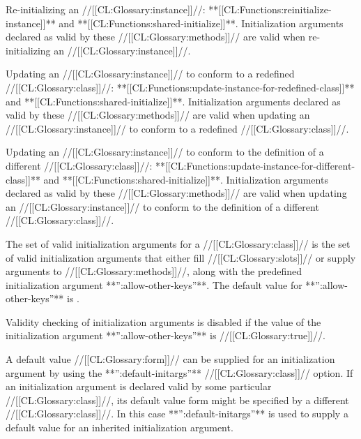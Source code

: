 \itemitem{--} Re-initializing an //[[CL:Glossary:instance]]//:
**[[CL:Functions:reinitialize-instance]]** and **[[CL:Functions:shared-initialize]]**.
Initialization arguments declared as valid by these //[[CL:Glossary:methods]]// are
valid when re-initializing an //[[CL:Glossary:instance]]//.

\itemitem{--}  Updating an //[[CL:Glossary:instance]]// to conform to a redefined //[[CL:Glossary:class]]//:
**[[CL:Functions:update-instance-for-redefined-class]]** and **[[CL:Functions:shared-initialize]]**.
Initialization arguments declared as valid by these //[[CL:Glossary:methods]]// are
valid when updating an //[[CL:Glossary:instance]]// to conform to a redefined //[[CL:Glossary:class]]//.

\itemitem{--} Updating an //[[CL:Glossary:instance]]// to conform to the definition of a
different //[[CL:Glossary:class]]//:
**[[CL:Functions:update-instance-for-different-class]]** and **[[CL:Functions:shared-initialize]]**.
Initialization arguments declared as valid by these //[[CL:Glossary:methods]]// are
valid when updating an //[[CL:Glossary:instance]]// to conform to the definition
of a different //[[CL:Glossary:class]]//.

\endlist
\endlist

The set of valid initialization arguments for a //[[CL:Glossary:class]]// is the set of
valid initialization arguments that either fill //[[CL:Glossary:slots]]// or supply
arguments to //[[CL:Glossary:methods]]//, along with the predefined initialization
argument **'':allow-other-keys''**.  The default value for 
**'':allow-other-keys''** is \nil.



Validity checking of initialization arguments is disabled if the value of
the initialization argument **'':allow-other-keys''** is //[[CL:Glossary:true]]//.


\endsubsection%


A default value //[[CL:Glossary:form]]// can be supplied for an initialization
argument by using the **'':default-initargs''** //[[CL:Glossary:class]]// option.  If an
initialization argument is declared valid by some particular //[[CL:Glossary:class]]//,
its default  value form might be specified by a different //[[CL:Glossary:class]]//. 
In this case **'':default-initargs''** is used to supply a default value
for an inherited initialization argument.

